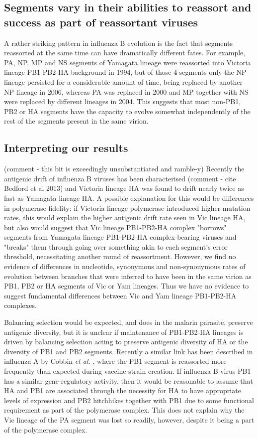 \documentclass[11pt,oneside,letterpaper]{article}
\begin{document}
\subsection*{Segments vary in their abilities to reassort and success as part of reassortant viruses}
A rather striking pattern in influenza B evolution is the fact that segments reassorted at the same time can have dramatically different fates.
For example, PA, NP, MP and NS segments of Yamagata lineage were reassorted into Victoria lineage PB1-PB2-HA background in 1994, but of those 4 segments only the NP lineage persisted for a considerable amount of time, being replaced by another NP lineage in 2006, whereas PA was replaced in 2000 and MP together with NS were replaced by different lineages in 2004.
This suggests that most non-PB1, PB2 or HA segments have the capacity to evolve somewhat independently of the rest of the segments present in the same virion.

\subsection*{Interpreting our results}
(comment - this bit is exceedingly unsubstantiated and ramble-y)
Recently the antigenic drift of influenza B viruses has been characterised (comment - cite Bedford et al 2013) and Victoria lineage HA was found to drift nearly twice as fast as Yamagata lineage HA.
A possible explanation for this would be differences in polymerase fidelity: if Victoria lineage polymerase introduced higher mutation rates, this would explain the higher antigenic drift rate seen in Vic lineage HA, but also would suggest that Vic lineage PB1-PB2-HA complex "borrows" segments from Yamagata lineage PB1-PB2-HA complex-bearing viruses and "breaks" them through going over something akin to each segment's error threshold, necessitating another round of reassortment.
However, we find no evidence of differences in nucleotide, synonymous and non-synonymous rates of evolution between branches that were inferred to have been in the same virion as PB1, PB2 or HA segments of Vic or Yam lineages.
Thus we have no evidence to suggest fundamental differences between Vic and Yam lineage PB1-PB2-HA complexes.

Balancing selection would be expected, and does in the malaria parasite, preserve antigenic diversity, but it is unclear if maintenance of PB1-PB2-HA lineages is driven by balancing selection acting to preserve antigenic diversity of HA or the diversity of PB1 and PB2 segments.
Recently a similar link has been described in influenza A by Cobbin \textit{et al.} \cite{cobbin2013}, where the PB1 segment is reassorted more frequently than expected during vaccine strain creation.
If influenza B virus PB1 has a similar gene-regulatory activity, then it would be reasonable to assume that HA and PB1 are associated through the necessity for HA to have appropriate levels of expression and PB2 hitchhikes together with PB1 due to some functional requirement as part of the polymerase complex.
This does not explain why the Vic lineage of the PA segment was lost so readily, however, despite it being a part of the polymerase complex.
\end{document}
